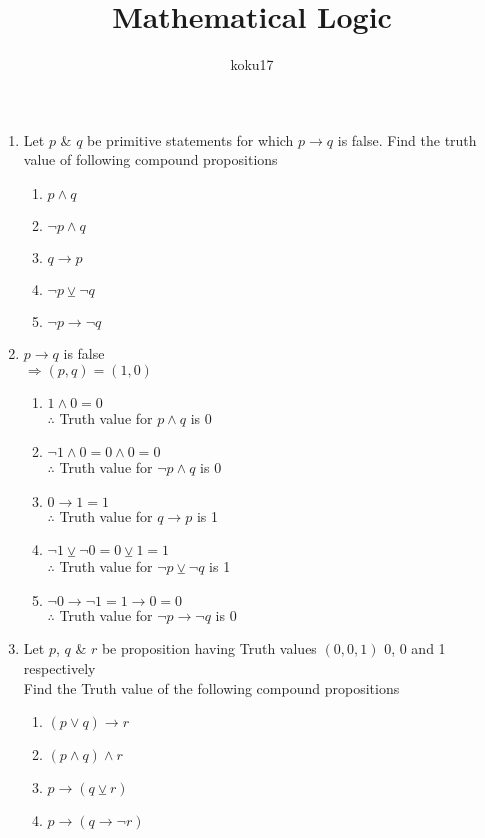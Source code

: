\documentclass{article}
\author{koku17}
\title{Mathematical Logic}
\newcommand{\answer}{\item [$\rightarrow$]}
\begin{document}
	\maketitle \thispagestyle{empty} \newpage \setcounter{page}{1}
	\begin{enumerate}[label=\arabic*. ]
		\item Let $p$ \& $q$ be primitive statements for which $p\to q$ is false. Find the truth value
			of following compound propositions
			\begin{enumerate}[label=\roman*) ]
				\item $p\land q$
				\item $\neg p\land q$
				\item $q\to p$
				\item $\neg p\veebar\neg q$
				\item $\neg p\to\neg q$
			\end{enumerate}
		\answer $p\to q$ is false \\ $\Longrightarrow (p,q)=(1,0)$
			\begin{enumerate}[label=\roman*) ]
				\item $1\land0=0$ \\ $\therefore$ Truth value for $p\land q$ is 0
				\item $\neg1\land0=0\land0=0$ \\ $\therefore$ Truth value for $\neg p\land q$ is
					0
				\item $0\to1=1$ \\ $\therefore$ Truth value for $q\to p$ is 1
				\item $\neg1\veebar\neg0=0\veebar1=1$ \\ $\therefore$ Truth value for
					$\neg p\veebar\neg q$ is 1
				\item $\neg0\to\neg1=1\to0=0$ \\ $\therefore$ Truth value for $\neg p\to\neg q$
					is 0
			\end{enumerate}
		\item Let $p$, $q$ \& $r$ be proposition having Truth values $(0,0,1)$ 0, 0 and 1 respectively
			\\ Find the Truth value of the following compound propositions
			\begin{enumerate}[label=\roman*) ]
				\item $(p\lor q)\to r$
				\item $(p\land q)\land r$
				\item $p\to(q\veebar r)$
				\item $p\to(q\to\neg r)$

\end{enumerate}
\end{enumerate}
\end{document}
